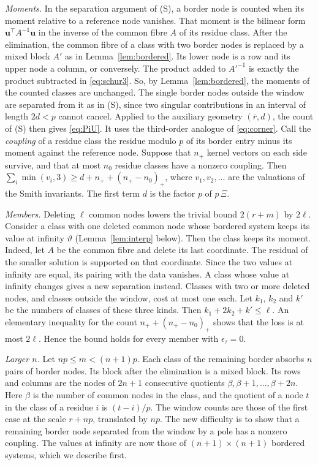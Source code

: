 \documentclass[11pt]{amsart}
\theoremstyle{definition}
\theoremstyle{remark}
\numberwithin{equation}{section}
\begin{document}
\emph{Moments.} In the separation argument of (S), a border node is counted when its moment relative to a reference
node vanishes. That moment is the bilinear form $\mathbf u^\top A^{-1}\mathbf u$ in the inverse of the common fibre $A$
of its residue class. After the elimination, the common fibre of a class with two border nodes is replaced by a mixed
block $A'$ as in Lemma~\ref{lem:bordered}. Its lower node is a row and its upper node a column, or conversely. The
product added to $A'^{-1}$ is exactly the product subtracted in \eqref{eq:schur3}. So, by Lemma~\ref{lem:bordered}, the
moments of the counted classes are unchanged. The single border nodes outside the window are separated from it as in
(S), since two singular contributions in an interval of length $2d<p$ cannot cancel. Applied to the auxiliary geometry
$(\bar r,d)$, the count of (S) then gives \eqref{eq:PiU}. It uses the third-order analogue of \eqref{eq:corner}. Call
the \emph{coupling} of a residue class the residue modulo $p$ of its border entry minus its moment against the reference
node. Suppose that $n_+$ kernel vectors on each side survive, and that at most $n_0$ residue classes have a nonzero
coupling. Then
$\sum_i\min(v_i,3)\ge d+n_++(n_+-n_0)_+$, where $v_1,v_2,\dots$ are the valuations of the
Smith invariants. The first term $d$ is the factor $p$ of $p\,\Xi$.

\emph{Members.} Deleting $\ell$ common nodes lowers the trivial bound $2(r+m)$ by $2\ell$. Consider a class with one
deleted common node whose bordered system keeps its value at infinity $\vartheta$ (Lemma~\ref{lem:interp} below). Then
the class keeps its moment. Indeed, let $A$ be the common fibre and delete its last coordinate. The residual of the
smaller solution is supported on that coordinate. Since the two values at infinity are equal, its pairing with the data
vanishes. A class whose value at infinity changes gives a new separation instead. Classes with
two or more deleted nodes, and classes outside the window, cost at most one each. Let $k_1$, $k_2$ and $k'$ be the
numbers of classes of these three kinds. Then $k_1+2k_2+k'\le\ell$. An elementary inequality for the count
$n_++(n_+-n_0)_+$ shows that the loss is at most $2\ell$. Hence the bound holds for every
member with $\epsilon_\tau=0$.

\emph{Larger $n$.} Let $np\le m<(n+1)p$. Each class of the remaining border absorbs $n$ pairs of border nodes. Its block
after the elimination is a mixed block. Its rows and columns are the nodes of $2n+1$ consecutive quotients
$\beta,\beta+1,\dots,\beta+2n$. Here $\beta$ is the number of common nodes in the class, and the quotient of a node $t$ in
the class of a residue $i$ is $(t-i)/p$. The window counts are those of the first case at the scale $r+np$, translated by
$np$. The new difficulty is to show that a remaining border node separated from the window by a pole has a nonzero
coupling. The values at infinity are now those of $(n+1)\times(n+1)$ bordered systems, which we describe first.
\end{document}
